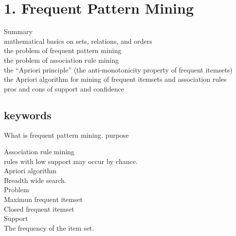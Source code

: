 \documentclass[a4paper,10pt,titlepage]{report}
\date{}
\begin{document}
\section{1.	Frequent Pattern Mining}
	
	Summary \\
\hspace{10mm}		mathematical basics on sets, relations, and orders \\
\hspace{10mm}		the problem of frequent pattern mining \\
\hspace{10mm}		the problem of association rule mining \\
\hspace{10mm}		the “Apriori principle” (the anti-monotonicity property of frequent itemsets) \\
\hspace{10mm}		the Apriori algorithm for mining of frequent itemsets and association rules \\
\hspace{10mm}		pros and cons of support and confidence \\	

\subsection{keywords}

What is frequent pattern mining.
purpose

Association rule mining\\
\hspace{10mm}	rules with low support may occur by chance. \\
Apriori algorithm\\
\hspace{10mm}	Breadth wide search. \\
\hspace{10mm}	Problem \\
Maximun frequent itemset\\
Closed frequent itemset\\

Support\\
\hspace{10mm}	The frequency of the item set.\\
\end{document}
